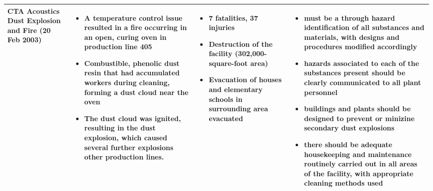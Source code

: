 {\begin{tabular}{@{}p{3cm}p{8cm}p{4cm}p{7cm}@{}}
CTA Acoustics Dust Explosion and Fire (20 Feb 2003)                                              & \begin{itemize}[leftmargin=1em]\item A temperature control issue resulted in a fire occurring in an open, curing oven in production line 405\item Combustible, phenolic dust resin that had accumulated workers during cleaning, forming a dust cloud near the oven\item The dust cloud was ignited, resulting in the dust explosion, which caused several further explosions other production lines.\end{itemize}                                                                                                                                                                                                                                                                                                                           & \begin{itemize}[leftmargin=1em]\item 7 fatalities, 37 injuries  \item Destruction of the facility (302,000-square-foot area)\item Evacuation of houses and elementary schools in surrounding area evacuated\end{itemize}                                                                               & \begin{itemize}[leftmargin=1em]\item must be a through hazard identification of all substances and materials, with designs and procedures modified accordingly\item hazards associated to each of the substances present should be clearly communicated to all plant personnel \item buildings and plants should be designed to prevent or minizine secondary dust explosions \item there should be adequate housekeeping and maintenance routinely carried out in all areas of the facility, with appropriate cleaning methods used\end{itemize}                                                                       \\ \bottomrule
\end{tabular}%
}